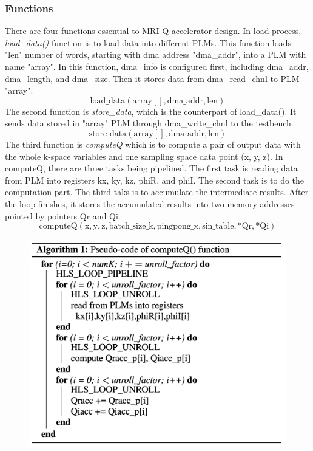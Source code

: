 \documentclass{sig-alternate}
\begin{document}
\subsubsection{Functions}
There are four functions essential to MRI-Q accelerator design. In load process, \textit{load\_data()} function is to load data into different PLMs. This function loads "len" number of words, starting with dma address "dma\_addr", into a PLM with name "array". In this function, dma\_info is configured first, including dma\_addr, dma\_length, and dma\_size. Then it stores data from dma\_read\_chnl to PLM "array".
$$\mathrm{load\_data(array[], dma\_addr, len)}$$
 The second function is \textit{store\_data}, which is the counterpart of load\_data(). It sends data stored in "array" PLM through dma\_write\_chnl to the testbench.
$$\mathrm{store\_data(array[], dma\_addr, len)}$$
The third function is \textit{computeQ} which is to compute a pair of output data with the whole k-space variables and one sampling space data point (x, y, z). In computeQ, there are three tasks being pipelined. The first task is reading data from PLM into registers kx, ky, kz, phiR, and phiI. The second task is to do the computation part. The third taks is to accumulate the intermediate results. After the loop finishes, it stores the accumulated results into two memory addresses pointed by pointers Qr and Qi.
$$\mathrm{computeQ(x, y, z, batch\_size\_k, pingpong\_x, sin\_table, *Qr, *Qi)}$$

\begin{figure}[t]
\centering
\captionsetup{justification=centering, format=hang}
\includegraphics[width=\columnwidth]{figure/computeQAlgorithm.png}
\label{fig-data-convert}
\end{figure}
\end{document}

